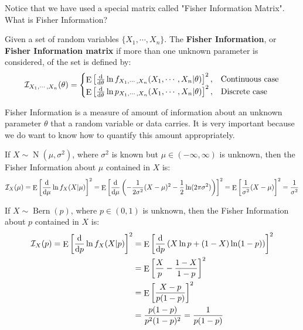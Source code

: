\documentclass{huhtakm-template-book-v2}
\DeclareMathOperator{\E}{E}
\DeclareMathOperator{\Bern}{Bern}
\DeclareMathOperator{\N}{N}
\begin{document}
Notice that we have used a special matrix called "Fisher Information Matrix". What is Fisher Information?
\begin{defn}
	Given a set of random variables $\{X_{1},\cdots,X_{n}\}$. The \textbf{Fisher Information}, or \textbf{Fisher Information matrix} if more than one unknown parameter is considered, of the set is defined by:
	\begin{equation*}
		\mathcal{I}_{X_{1},\cdots,X_{n}}(\theta)=\begin{cases}
			\E\left[\odv*{}{\theta}\ln{f_{X_{1},\cdots,X_{n}}(X_{1},\cdots,X_{n}|\theta)}\right]^{2}, &\text{Continuous case}\\
			\E\left[\odv*{}{\theta}\ln{p_{X_{1},\cdots,X_{n}}(X_{1},\cdots,X_{n}|\theta)}\right]^{2}, &\text{Discrete case}
		\end{cases}
	\end{equation*}
\end{defn}
\begin{rem}
	Fisher Information is a measure of amount of information about an unknown parameter $\theta$ that a random variable or data carries. It is very important because we do want to know how to quantify this amount appropriately.
\end{rem}
\begin{eg}
	If $X\sim\N(\mu,\sigma^{2})$, where $\sigma^{2}$ is known but $\mu\in(-\infty,\infty)$ is unknown, then the Fisher Information about $\mu$ contained in $X$ is:
	\begin{equation*}
		\mathcal{I}_{X}(\mu)=\E\left[\odv*{\ln{f_{X}(X|\mu)}}{\mu}\right]^{2}=\E\left[\odv*{}{\mu}\left(-\frac{1}{2\sigma^{2}}(X-\mu)^{2}-\frac{1}{2}\ln(2\pi\sigma^{2})\right)\right]^{2}=\E\left[\frac{1}{\sigma^{2}}(X-\mu)\right]^{2}=\frac{1}{\sigma^{2}}
	\end{equation*}
\end{eg}
\begin{eg}
	If $X\sim\Bern(p)$, where $p\in(0,1)$ is unknown, then the Fisher Information about $p$ contained in $X$ is:
	\begin{align*}
		\mathcal{I}_{X}(p)=\E\left[\odv*{\ln{f_{X}(X|p)}}{p}\right]^{2}&=\E\left[\odv*{}{p}\left(X\ln{p}+(1-X)\ln(1-p)\right)\right]^{2}\\
		&=\E\left[\frac{X}{p}-\frac{1-X}{1-p}\right]^{2}\\
		&=\E\left[\frac{X-p}{p(1-p)}\right]^{2}\\
		&=\frac{p(1-p)}{p^{2}(1-p)^{2}}=\frac{1}{p(1-p)}
	\end{align*}
\end{eg}
\end{document}
